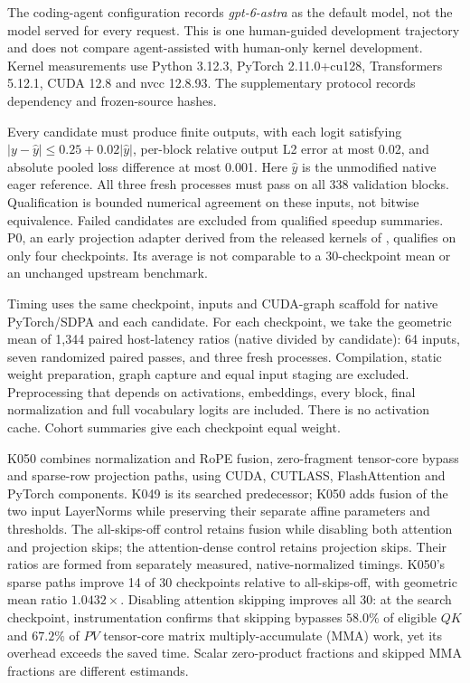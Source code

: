 The coding-agent configuration records \emph{gpt-6-astra} as the default
model, not the model served for every request. This is one human-guided
development trajectory and does not compare agent-assisted with human-only
kernel development. Kernel measurements use Python 3.12.3, PyTorch
2.11.0+cu128, Transformers 5.12.1, CUDA 12.8 and nvcc 12.8.93.
The supplementary protocol records dependency and frozen-source hashes.

Every candidate must produce finite outputs, with each logit satisfying
$|y-\hat y|\leq0.25+0.02|\hat y|$, per-block relative output L2 error at
most 0.02, and absolute pooled loss difference at most 0.001. Here
$\hat y$ is the unmodified native eager reference. All three fresh
processes must pass on all 338 validation blocks. Qualification is bounded
numerical agreement on these inputs, not bitwise equivalence. Failed
candidates are excluded from qualified speedup summaries. P0, an early
projection adapter derived from the released kernels of
\citet{cetin2026sparser}, qualifies on only four checkpoints. Its average
is not comparable to a 30-checkpoint mean or an unchanged upstream benchmark.

Timing uses the same checkpoint, inputs and CUDA-graph scaffold for native
PyTorch/SDPA and each candidate. For each checkpoint, we take the geometric
mean of 1,344 paired host-latency ratios (native divided by candidate): 64 inputs,
seven randomized paired passes, and three fresh processes. Compilation,
static weight preparation, graph capture and equal input staging
are excluded. Preprocessing that depends on activations, embeddings, every block,
final normalization and full vocabulary logits are included. There is no
activation cache. Cohort summaries give each checkpoint equal weight.

K050 combines normalization and RoPE fusion, zero-fragment tensor-core
bypass and sparse-row projection paths, using CUDA, CUTLASS,
FlashAttention and PyTorch components. K049 is its searched predecessor;
K050 adds fusion of the two input LayerNorms while preserving their separate
affine parameters and thresholds. The all-skips-off control retains
fusion while disabling both attention and projection skips; the
attention-dense control retains projection skips. Their ratios are formed
from separately measured, native-normalized timings. K050's sparse paths
improve 14 of 30 checkpoints relative to all-skips-off, with geometric
mean ratio $1.0432\times$. Disabling attention skipping improves all 30:
at the search checkpoint, instrumentation confirms that skipping bypasses
$58.0\%$ of eligible $QK$ and $67.2\%$ of $PV$ tensor-core
matrix multiply-accumulate (MMA) work, yet its overhead
exceeds the saved time. Scalar zero-product fractions and skipped MMA
fractions are different estimands.

